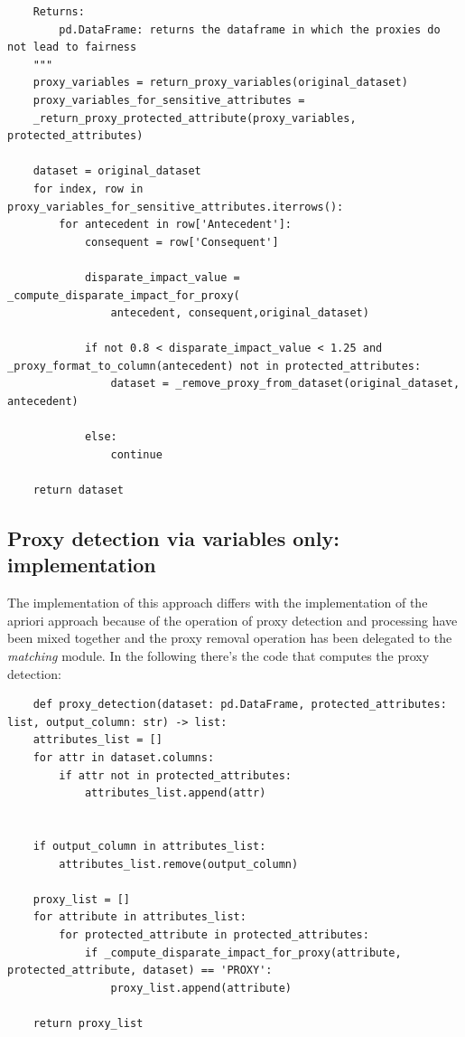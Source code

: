 \documentclass[12pt,a4paper,openright,twoside]{book}
\begin{document}
\begin{enumerate}
\begin{lstlisting}
    Returns:
        pd.DataFrame: returns the dataframe in which the proxies do not lead to fairness
    """
    proxy_variables = return_proxy_variables(original_dataset)
    proxy_variables_for_sensitive_attributes = 
    _return_proxy_protected_attribute(proxy_variables, protected_attributes)
    
    dataset = original_dataset
    for index, row in proxy_variables_for_sensitive_attributes.iterrows():
        for antecedent in row['Antecedent']:
            consequent = row['Consequent']

            disparate_impact_value = _compute_disparate_impact_for_proxy(
                antecedent, consequent,original_dataset)

            if not 0.8 < disparate_impact_value < 1.25 and _proxy_format_to_column(antecedent) not in protected_attributes:
                dataset = _remove_proxy_from_dataset(original_dataset, antecedent)

            else:
                continue

    return dataset

    \end{lstlisting}
\end{enumerate}

\subsection{Proxy detection via variables only: implementation}
The implementation of this approach differs with the implementation of the apriori approach because of the operation of proxy detection and processing have been mixed together and the proxy removal operation has been delegated to the \emph{matching} module. In the following there's the code that computes the proxy detection:
\begin{lstlisting}
    def proxy_detection(dataset: pd.DataFrame, protected_attributes: list, output_column: str) -> list:
    attributes_list = []
    for attr in dataset.columns:
        if attr not in protected_attributes:
            attributes_list.append(attr)
            
          
    if output_column in attributes_list:
        attributes_list.remove(output_column)
        
    proxy_list = []
    for attribute in attributes_list:
        for protected_attribute in protected_attributes:
            if _compute_disparate_impact_for_proxy(attribute, protected_attribute, dataset) == 'PROXY':
                proxy_list.append(attribute)

    return proxy_list

\end{lstlisting}
\newpage
\end{document}
